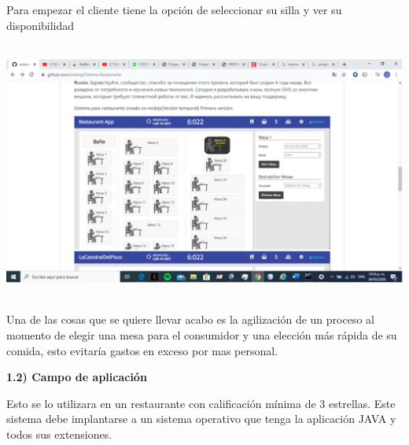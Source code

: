 \documentclass{article} %
\begin{document}
\noindent Para empezar el cliente tiene la opci\'{o}n de seleccionar su silla y ver su disponibilidad 

\noindent \includegraphics*[width=5.46in, height=3.35in, keepaspectratio=false, trim=2.02in 0.78in 4.34in 1.38in]{image2}

\noindent 

\noindent 

\noindent 

\noindent 

\noindent 

\noindent 

\noindent 

\noindent 

\noindent 

\noindent Una de las cosas que se quiere llevar acabo es la agilizaci\'{o}n de un proceso al momento de elegir    una mesa para el consumidor y una elecci\'{o}n m\'{a}s r\'{a}pida de su comida, esto evitar\'{i}a gastos en exceso por mas personal.

\noindent 

\noindent 

\noindent 

\noindent \textbf{ 1.2) Campo de aplicaci\'{o}n}

\noindent   Esto se lo utilizara en un restaurante con calificaci\'{o}n m\'{i}nima de 3 estrellas. Este sistema   debe implantarse a un sistema operativo que tenga la aplicaci\'{o}n JAVA y todos sus extensiones.

\noindent 
\end{document}
